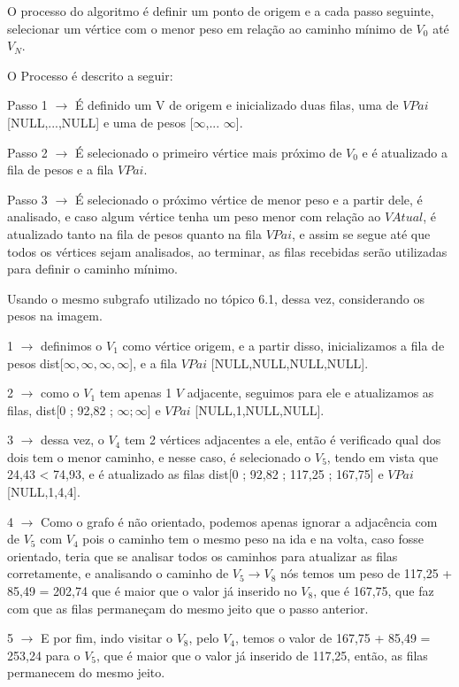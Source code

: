 O processo do algoritmo é definir um ponto de origem e a cada passo seguinte, selecionar um vértice com o menor peso em relação ao caminho mínimo de $V_0$ até $V_N$.

O Processo é descrito a seguir:

Passo 1 $\rightarrow$ É definido um V de origem e inicializado duas filas, uma de $VPai$ [NULL,...,NULL] e uma de pesos [$\infty$,... $\infty$].

Passo 2 $\rightarrow$ É selecionado o primeiro vértice mais próximo de $V_0$ e é atualizado a fila de pesos e a fila $VPai$.

Passo 3 $\rightarrow$ É selecionado o próximo vértice de menor peso e a partir dele, é analisado, e caso algum vértice tenha um peso menor com relação ao $VAtual$, é atualizado tanto na fila de pesos quanto na fila $VPai$, e assim se segue até que todos os vértices sejam analisados, ao terminar, as filas recebidas serão utilizadas para definir o caminho mínimo.

Usando o mesmo subgrafo utilizado no tópico 6.1, dessa vez, considerando os pesos na imagem.

1 $\rightarrow$ definimos o $V_1$ como vértice origem, e a partir disso, inicializamos a fila de pesos dist[$\infty , \infty, \infty, \infty$], e a fila $VPai$ [NULL,NULL,NULL,NULL].

2 $\rightarrow$ como o $V_1$ tem apenas 1 $V$ adjacente, seguimos para ele e atualizamos as filas, dist[0 ; 92,82 ; $\infty ; \infty$] e $VPai$ [NULL,1,NULL,NULL].

3 $\rightarrow$ dessa vez, o $V_4$ tem 2 vértices adjacentes a ele, então é verificado qual dos dois tem o menor caminho, e nesse caso, é selecionado o $V_5$, tendo em vista que 24,43 < 74,93, e é atualizado as filas dist[0 ; 92,82 ; 117,25 ; 167,75] e $VPai$ [NULL,1,4,4].

4 $\rightarrow$ Como o grafo é não orientado, podemos apenas ignorar a adjacência com de $V_5$ com $V_4$ pois o caminho tem o mesmo peso na ida e na volta, caso fosse orientado, teria que se analisar todos os caminhos para atualizar as filas corretamente, e analisando o caminho de $V_5 \rightarrow V_8$ nós temos um peso de 117,25 + 85,49 = 202,74 que é maior que o valor já inserido no $V_8$, que é 167,75, que faz com que as filas permaneçam do mesmo jeito que o passo anterior.

5 $\rightarrow$ E por fim, indo visitar o $V_8$, pelo $V_4$, temos o valor de 167,75 + 85,49 = 253,24 para o $V_5$, que é maior que o valor já inserido de 117,25, então, as filas permanecem do mesmo jeito.

